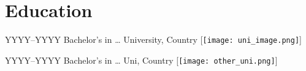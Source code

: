 \documentclass{../source/personalcv}
\begin{document}

\section{Education}

\cventry
{YYYY--YYYY}
{Bachelor's in \dots}
{University, Country}
[\texttt{[image: uni\_image.png]}]

\cventry
{YYYY--YYYY}
{Bachelor's in \dots}
{Uni, Country}
[\texttt{[image: other\_uni.png]}]
\end{document}
